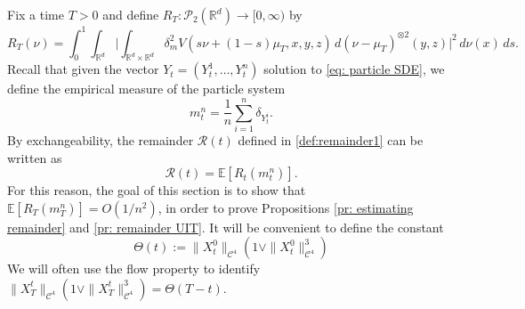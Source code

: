 \documentclass[11pt,reqno]{amsart}
\numberwithin{equation}{section}
\theoremstyle{definition}
\def\E{{\mathbb E}}
\def\R{{\mathbb R}}
\begin{document}
Fix a time $T>0$ and define $R_T : \mathcal P_2(\R^d) \to [0,\infty)$ by
\begin{equation}
    R_T(\nu)= \int_0^1\int_{\R^d}\Big|\int_{\R^d\times \R^d} \delta_m^2  V(s\nu+(1-s)\mu_T,x,y,z)\,d(\nu-\mu_T)^{\otimes2}(y,z)\Big|^2\,d\nu(x)\,ds. 
\end{equation}
Recall that given the vector $Y_t=(Y_t^1,\dots,Y_t^n)$ solution to \ref{eq: particle SDE}, we define the empirical measure of the particle system 
\[m_t^n=\frac 1n \sum_{i=1}^n\delta_{Y_t^i}.\]
By exchangeability, the remainder $\mathcal R(t)$ defined in \eqref{def:remainder1} can be written as
\[
\mathcal R(t) = \E[R_t(m^n_t)].
\]
For this reason, the goal of this section is to show that $\E[R_T(m_T^n)] = O(1/n^2)$, in order to  prove Propositions \ref{pr: estimating remainder} and \ref{pr: remainder UIT}. It will be convenient to define the constant
\begin{equation}
\label{eq: definition of Theta}
    \Theta(t):=\|X^0_t\|_{\mathcal{C}^4}(1\vee \|X^0_t\|_{\mathcal{C}^4}^3)
\end{equation}
We will often use the flow property to identify $\|X^t_T\|_{\mathcal{C}^4}(1\vee \|X^t_T\|_{\mathcal{C}^4}^3)=\Theta(T-t)$.
\end{document}
